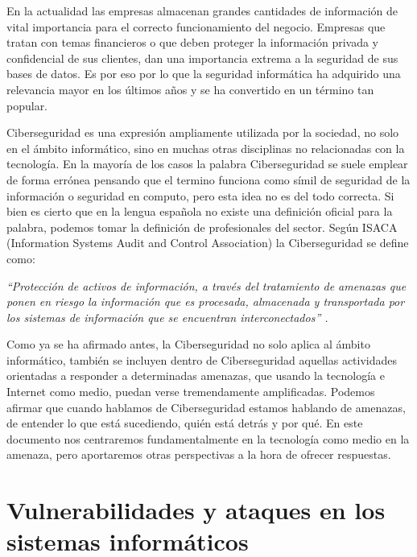 En la actualidad las empresas almacenan grandes cantidades de información de vital importancia
para el correcto funcionamiento del negocio. Empresas que tratan con temas financieros 
o que deben proteger la información privada y confidencial de sus clientes, dan una importancia 
extrema a la seguridad de sus bases de datos. Es por eso por lo que la seguridad informática 
ha adquirido una relevancia mayor en los últimos años y se ha convertido en un término tan 
popular.

Ciberseguridad es una expresión ampliamente utilizada por la sociedad, no solo en el ámbito 
informático, sino en muchas otras disciplinas no relacionadas con la tecnología. En la mayoría 
de los casos la palabra Ciberseguridad se suele emplear de forma errónea pensando que el 
termino funciona como símil de seguridad de la información o seguridad en computo, pero esta
idea no es del todo correcta. Si bien es cierto que en la lengua española no existe una definición 
oficial para la palabra, podemos tomar la definición de profesionales del sector. 
Según ISACA (Information Systems Audit and Control Association) la Ciberseguridad se define como:

\emph{“Protección de activos de información, a través del tratamiento de amenazas que ponen en riesgo la información 
que es procesada, almacenada y transportada por los sistemas de información que se encuentran interconectados” \cite{bsecure}.}

Como ya se ha afirmado antes, la Ciberseguridad no solo aplica al ámbito informático, también se incluyen dentro de Ciberseguridad 
aquellas actividades orientadas a responder a determinadas amenazas, que usando la tecnología e Internet como medio, puedan 
verse tremendamente amplificadas. Podemos afirmar que cuando hablamos de Ciberseguridad estamos hablando de amenazas, 
de entender lo que está sucediendo, quién está detrás y por qué. En este documento nos centraremos fundamentalmente en la 
tecnología como medio en la amenaza, pero aportaremos otras perspectivas a la hora de ofrecer respuestas.




\chapter{Vulnerabilidades y ataques en los sistemas informáticos}
\label{cha:vulneravilidades-y-ataques}

